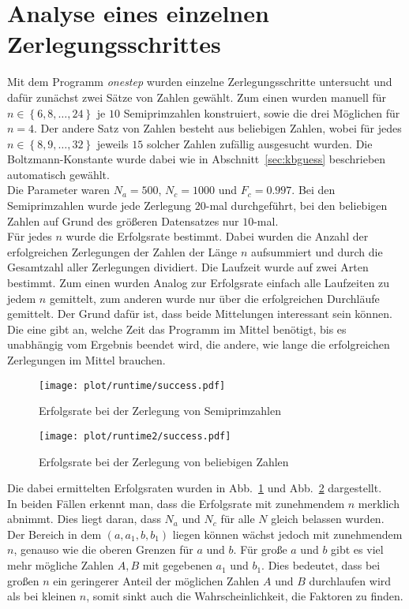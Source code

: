 \section{Analyse eines einzelnen Zerlegungsschrittes}
Mit dem Programm \textit{onestep} wurden einzelne Zerlegungsschritte untersucht und dafür zunächst zwei Sätze von Zahlen gewählt. Zum einen wurden manuell für $n\in\left\{6,8,\dots,24\right\}$ je $10$ Semiprimzahlen konstruiert, sowie die drei Möglichen für $n=4$. Der andere Satz von Zahlen besteht aus beliebigen Zahlen, wobei für jedes $n\in\left\{8,9,\dots,32\right\}$ jeweils $15$ solcher Zahlen zufällig ausgesucht wurden. Die Boltzmann-Konstante wurde dabei wie in Abschnitt~\ref{sec:kbguess} beschrieben automatisch gewählt.\\
Die Parameter waren $N_a=500$, $N_c=1000$ und $F_c=0.997$. Bei den Semiprimzahlen wurde jede Zerlegung $20$-mal durchgeführt, bei den beliebigen Zahlen auf Grund des größeren Datensatzes nur $10$-mal. \\
Für jedes $n$ wurde die Erfolgsrate bestimmt. Dabei wurden die Anzahl der erfolgreichen Zerlegungen der Zahlen der Länge $n$ aufsummiert und durch die Gesamtzahl aller Zerlegungen dividiert. Die Laufzeit wurde auf zwei Arten bestimmt. Zum einen wurden Analog zur Erfolgsrate einfach alle Laufzeiten zu jedem $n$ gemittelt, zum anderen wurde nur über die erfolgreichen Durchläufe gemittelt. Der Grund dafür ist, dass beide Mittelungen interessant sein können. Die eine gibt an, welche Zeit das Programm im Mittel benötigt, bis es unabhängig vom Ergebnis beendet wird, die andere, wie lange die erfolgreichen Zerlegungen im Mittel brauchen. \\
\begin{figure}[h!]
		\centering
		\texttt{[image: plot/runtime/success.pdf]}
		\caption{Erfolgsrate bei der Zerlegung von Semiprimzahlen}\label{fig:runtime-success}
\end{figure}
\begin{figure}[h!]
		\centering
		\texttt{[image: plot/runtime2/success.pdf]}
		\caption{Erfolgsrate bei der Zerlegung von beliebigen Zahlen}\label{fig:runtime2-success}
\end{figure}
Die dabei ermittelten Erfolgsraten wurden in Abb.~\ref{fig:runtime-success} und Abb.~\ref{fig:runtime2-success} dargestellt. \\
In beiden Fällen erkennt man, dass die Erfolgsrate mit zunehmendem $n$ merklich abnimmt. Dies liegt daran, dass $N_a$ und $N_c$ für alle $N$ gleich belassen wurden. Der Bereich in dem $\left(a,a_1,b,b_1\right)$ liegen können wächst jedoch mit zunehmendem $n$, genauso wie die oberen Grenzen für $a$ und $b$. Für große $a$ und $b$ gibt es viel mehr mögliche Zahlen $A, B$ mit gegebenen $a_1$ und $b_1$. Dies bedeutet, dass bei großen $n$ ein geringerer Anteil der möglichen Zahlen $A$ und $B$ durchlaufen wird als bei kleinen $n$, somit sinkt auch die Wahrscheinlichkeit, die Faktoren zu finden.
